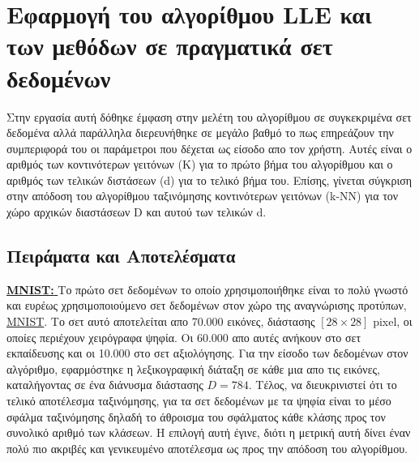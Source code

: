 \section{Εφαρμογή του αλγορίθμου \textlatin{LLE} και των μεθόδων σε πραγματικά σετ δεδομένων}
\par
Στην εργασία αυτή δόθηκε έμφαση στην μελέτη του αλγορίθμου σε συγκεκριμένα σετ δεδομένα αλλά παράλληλα διερευνήθηκε σε μεγάλο βαθμό το πως επηρεάζουν την συμπεριφορά του οι παράμετροι που δέχεται ως είσοδο απο τον χρήστη. Αυτές είναι ο αριθμός των κοντινότερων γειτόνων \textlatin{(K)} για το πρώτο βήμα του αλγορίθμου και ο αριθμός των τελικών διστάσεων \textlatin{(d)} για το τελικό βήμα του. Επίσης, γίνεται σύγκριση στην απόδοση του αλγορίθμου ταξινόμησης κοντινότερων γειτόνων \textlatin{(k-NN)} για τον χώρο αρχικών διαστάσεων \textlatin{D} και αυτού των τελικών \textlatin{d}. 

\subsection{Πειράματα και Αποτελέσματα}
\par
\href{http://yann.lecun.com/exdb/mnist/}{\textbf{\textlatin{MNIST: }}}Το πρώτο σετ δεδομένων το οποίο χρησιμοποιήθηκε είναι το πολύ γνωστό και ευρέως χρησιμοποιούμενο σετ δεδομένων στον χώρο της αναγνώρισης προτύπων, \href{http://yann.lecun.com/exdb/mnist/}{\textlatin{MNIST}}. Το σετ αυτό αποτελείται απο 70.000 εικόνες, διάστασης $[28 \times 28]$ \textlatin{pixel}, οι οποίες περιέχουν χειρόγραφα ψηφία. Οι 60.000 απο αυτές ανήκουν στο σετ εκπαίδευσης και οι 10.000 στο σετ αξιολόγησης. Για την είσοδο των δεδομένων στον αλγόριθμο, εφαρμόστηκε η λεξικογραφική διάταξη σε κάθε μια απο τις εικόνες, καταλήγοντας σε ένα διάνυσμα διάστασης $D = 784$. Τέλος, να διευκρινιστεί ότι το τελικό αποτέλεσμα ταξινόμησης, για τα σετ δεδομένων με τα ψηφία είναι το μέσο σφάλμα ταξινόμησης δηλαδή το άθροισμα του σφάλματος κάθε κλάσης προς τον συνολικό αριθμό των κλάσεων. Η επιλογή αυτή έγινε, διότι η μετρική αυτή δίνει έναν πολύ πιο ακριβές και γενικευμένο αποτέλεσμα ως προς την απόδοση του αλγορίθμου.
 
